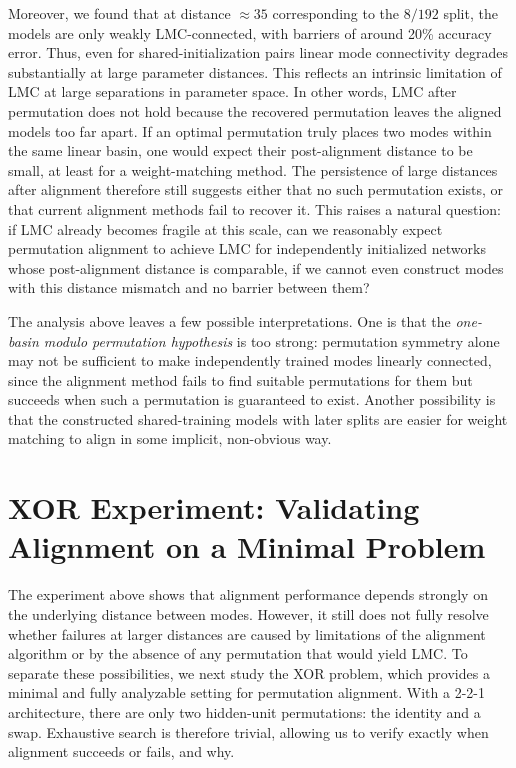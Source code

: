 \documentclass[11pt,a4paper]{report}
\begin{document}
Moreover, we found that at distance $\approx 35$ corresponding to the $8/192$ split, the models are only weakly LMC-connected, with barriers of around 20\% accuracy error. Thus, even for shared-initialization pairs linear mode connectivity degrades substantially at large parameter distances. This reflects an intrinsic limitation of LMC at large separations in parameter space. In other words, LMC after permutation does not hold because the recovered permutation leaves the aligned models too far apart. If an optimal permutation truly places two modes within the same linear basin, one would expect their post-alignment distance to be small, at least for a weight-matching method. The persistence of large distances after alignment therefore still suggests either that no such permutation exists, or that current alignment methods fail to recover it. This raises a natural question: if LMC already becomes fragile at this scale, can we reasonably expect permutation alignment to achieve LMC for independently initialized networks whose post-alignment distance is comparable, if we cannot even construct modes with this distance mismatch and no barrier between them?

The analysis above leaves a few possible interpretations. One is that the \textit{one-basin modulo permutation hypothesis} is too strong: permutation symmetry alone may not be sufficient to make independently trained modes linearly connected, since the alignment method fails to find suitable permutations for them but succeeds when such a permutation is guaranteed to exist. Another possibility is that the constructed shared-training models with later splits are easier for weight matching to align in some implicit, non-obvious way.



\section{XOR Experiment: Validating Alignment on a Minimal Problem}

The experiment above shows that alignment performance depends strongly on the underlying distance between modes. However, it still does not fully resolve whether failures at larger distances are caused by limitations of the alignment algorithm or by the absence of any permutation that would yield LMC. To separate these possibilities, we next study the XOR problem, which provides a minimal and fully analyzable setting for permutation alignment. With a 2-2-1 architecture, there are only two hidden-unit permutations: the identity and a swap. Exhaustive search is therefore trivial, allowing us to verify exactly when alignment succeeds or fails, and why.
\end{document}
